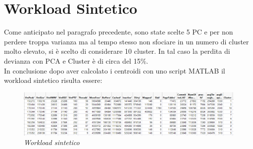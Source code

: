\newpage
\section{Workload Sintetico}
Come anticipato nel paragrafo precedente, sono state scelte 5 PC e per non perdere troppa varianza ma al tempo stesso non sfociare in un numero di cluster molto elevato, si è scelto di considerare 10 cluster. In tal caso la perdita di devianza con PCA e Cluster è di circa del 15\%.
\\In conclusione dopo aver calcolato i centroidi con uno script MATLAB il workload sintetico risulta essere:
\begin{figure}[H]
	\centering
	\includegraphics[width=\textwidth]{img/hw1/workload_sintetico.png}
	\caption{\textit{Workload sintetico}}
\end{figure}